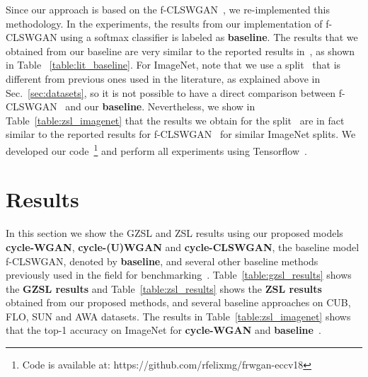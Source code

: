 \documentclass[runningheads]{llncs}
\begin{document}
%
%
%
%
Since our approach is based on the f-CLSWGAN~\cite{XianCVPR2018}, we re-implemented this methodology.%
In the experiments, the results from our implementation of f-CLSWGAN using a softmax classifier is labeled as \textbf{baseline}.
The results that we obtained from our baseline are very similar to the reported results in~\cite{XianCVPR2018}, as shown in Table ~\ref{table:lit_baseline}. 
For ImageNet, note that we use a split~\cite{wang2017multi} that is different from previous ones used in the literature, as explained above in Sec.~\ref{sec:datasets}, so it is not possible to have a direct comparison between f-CLSWGAN~\cite{XianCVPR2018} and our \textbf{baseline}.  Nevertheless, we show in Table~\ref{table:zsl_imagenet} that the results we obtain for the split~\cite{wang2017multi} are in fact similar to the reported results  for f-CLSWGAN~\cite{XianCVPR2018} for similar ImageNet splits.
We developed our code~\footnote{Code is available at: https://github.com/rfelixmg/frwgan-eccv18} and perform all experiments using Tensorflow~\cite{abadi2016tensorflow}.



%
%
%
%
%
%
%
%
%
\section{Results}


In this section we show the GZSL and ZSL results using our proposed models \textbf{cycle-WGAN}, \textbf{cycle-(U)WGAN}  and \textbf{cycle-CLSWGAN}, the baseline model f-CLSWGAN, denoted by \textbf{baseline}, and several other baseline methods previously used in the field for benchmarking~\cite{XianCVPR2017}. 
Table~\ref{table:gzsl_results} shows the \textbf{GZSL results} and Table~\ref{table:zsl_results} shows the \textbf{ZSL results} obtained from our proposed methods, and several baseline approaches on CUB, FLO, SUN and AWA datasets.
The results in Table~\ref{table:zsl_imagenet} shows that the top-1 accuracy on ImageNet for \textbf{cycle-WGAN} and \textbf{baseline}~\cite{XianCVPR2018}.



\end{document}
